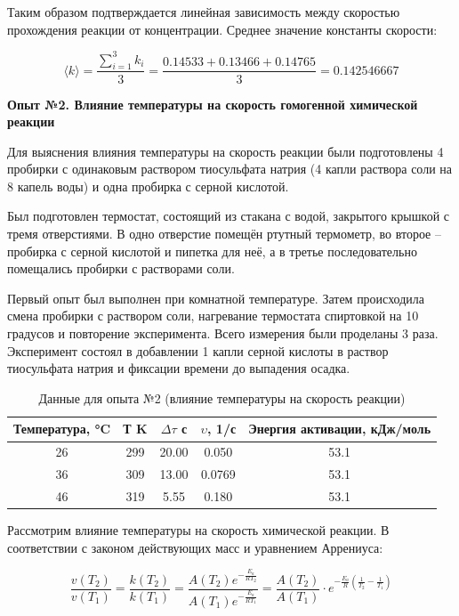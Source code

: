 \documentclass[a4paper,12pt]{article}
\begin{document}
	\quad Таким образом подтверждается линейная зависимость между скоростью прохождения реакции от концентрации. Среднее значение константы скорости:
	
	\[
	\langle k \rangle = \frac{\displaystyle\sum\limits_{i=1}^3 k_i}{3} = \frac{0.14533 +  0.13466 + 0.14765}{3} = 0.142546667
	\]
	
	\vspace{1em}
	
	\quad \textbf{Опыт №2. Влияние температуры на скорость гомогенной химической реакции}
	
	Для выяснения влияния температуры на скорость реакции были подготовлены 4 пробирки с одинаковым раствором тиосульфата натрия (4 капли раствора соли на 8 капель воды) и одна пробирка с серной кислотой.
	
	Был подготовлен термостат, состоящий из стакана с водой, закрытого крышкой с тремя отверстиями. В одно отверстие помещён ртутный термометр, во второе -- пробирка с серной кислотой и пипетка для неё, а в третье последовательно помещались пробирки с растворами соли.
	
	Первый опыт был выполнен при комнатной температуре. Затем происходила смена пробирки с раствором соли, нагревание термостата спиртовкой на 10 градусов и повторение эксперимента. Всего измерения были проделаны 3 раза. Эксперимент состоял в добавлении 1 капли серной кислоты в раствор тиосульфата натрия и фиксации времени до выпадения осадка.
	
	\begin{table}[h!]
		\centering
		\caption{Данные для опыта №2 (влияние температуры на скорость реакции)}
		\begin{tabular}{c|c|c|c|c}
			\toprule
			\textbf{Температура, °C} & \textbf{Т K} & \textbf{$\Delta\tau$ с} & \textbf{ $\upsilon$, 1/с} & \textbf{Энергия активации, кДж/моль} \\ \hline
			26 & 299 & 20.00 & 0.050 & 53.1 \\ 
			36 & 309 & 13.00 & 0.0769 & 53.1 \\ 
			46 & 319 & 5.55 & 0.180 & 53.1 \\ 
			\bottomrule
		\end{tabular}
	\end{table}
	
	Рассмотрим влияние температуры на скорость химической реакции. В соответствии с законом действующих масс и уравнением Аррениуса:
	
	\[
	\frac{v(T_2)}{v(T_1)} = \frac{k(T_2)}{k(T_1)} = \frac{A(T_2)e^{-\frac{E_a}{RT_2}}}{A(T_1)e^{-\frac{E_a}{RT_1}}} = \frac{A(T_2)}{A(T_1)} \cdot e^{-\frac{E_a}{R} \left( \frac{1}{T_2} - \frac{1}{T_1} \right)}
	\]
	
\end{document}
